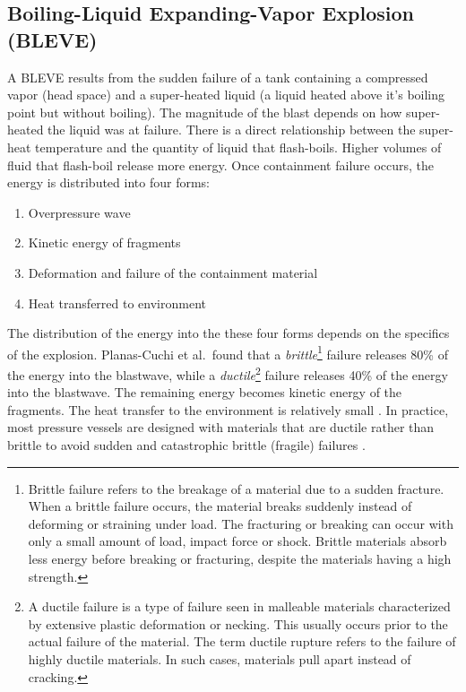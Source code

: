 \documentclass[10pt,parskip=half,
toc=sectionentrywithdots,
bibliography=totocnumbered,
captions=tableheading,numbers=noendperiod]{scrartcl}
\providecommand{\tightlist}{%
  \setlength{\itemsep}{0pt}\setlength{\parskip}{0pt}}
\begin{document}
\hypertarget{boiling-liquid-expanding-vapor-explosion-bleve}{%
\subsection{Boiling-Liquid Expanding-Vapor Explosion
(BLEVE)}\label{boiling-liquid-expanding-vapor-explosion-bleve}}

A BLEVE results from the sudden failure of a tank containing a
compressed vapor (head space) and a super-heated liquid (a liquid heated
above it's boiling point but without boiling). The magnitude of the
blast depends on how super-heated the liquid was at failure. There is a
direct relationship between the super-heat temperature and the quantity
of liquid that flash-boils. Higher volumes of fluid that flash-boil
release more energy. Once containment failure occurs, the energy is
distributed into four forms:

\begin{enumerate}
\def\labelenumi{\arabic{enumi}.}
\tightlist
\item
  Overpressure wave
\item
  Kinetic energy of fragments
\item
  Deformation and failure of the containment material
\item
  Heat transferred to environment
\end{enumerate}

The distribution of the energy into the these four forms depends on the
specifics of the explosion. Planas-Cuchi et al.~found that a
\emph{brittle}\footnote{Brittle failure refers to the breakage of a material due to a sudden fracture. When a brittle failure occurs, the material breaks suddenly instead of deforming or straining under load. The fracturing or breaking can occur with only a small amount of load, impact force or shock. Brittle materials absorb less energy before breaking or fracturing, despite the materials having a high strength.}
failure releases 80\% of the energy into the blastwave, while a
\emph{ductile}\footnote{A ductile failure is a type of failure seen in malleable materials characterized by extensive plastic deformation or necking. This usually occurs prior to the actual failure of the material. The term ductile rupture refers to the failure of highly ductile materials. In such cases, materials pull apart instead of cracking.}
failure releases 40\% of the energy into the blastwave. The remaining
energy becomes kinetic energy of the fragments. The heat transfer to the
environment is relatively small \cite{Planas2004}. In practice, most
pressure vessels are designed with materials that are ductile rather
than brittle to avoid sudden and catastrophic brittle (fragile) failures
\cite{Benac2016}.
\end{document}
